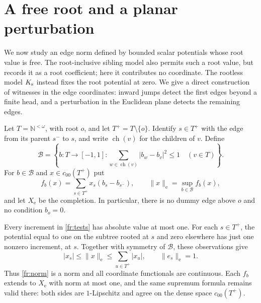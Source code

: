 \section{A free root and a planar perturbation}
\label{fr:section}\label{sec:free-root}

We now study an edge norm defined by bounded scalar potentials whose
root value is free. The root-inclusive sibling model also permits such a
root value, but records it as a root coefficient; here it contributes no
coordinate. The rootless model $K_{\rm s}$ instead fixes the root potential
at zero. We give a direct construction of witnesses in the edge coordinates: inward jumps detect
the first edges beyond a finite head, and a perturbation in the Euclidean
plane detects the remaining edges.

Let $T=\mathbb N^{<\omega}$, with root $o$, and let
$T^+=T\setminus\{o\}$.  Identify $s\in T^+$ with the edge from its
parent $s^-$ to $s$, and write $\operatorname{ch}(v)$ for the children of
$v$.  Define
\begin{equation}
 \mathcal B=\left\{b:T\longrightarrow[-1,1]:
 \sum_{w\in\operatorname{ch}(v)}|b_w-b_v|^2\le1
 \quad(v\in T)\right\}.
 \label{fr:tests}
\end{equation}
For $b\in\mathcal B$ and $x\in c_{00}(T^+)$ put
\begin{equation}
 f_b(x)=\sum_{s\in T^+}x_s(b_s-b_{s^-}),
 \qquad \|x\|_{\mathrm e}=\sup_{b\in\mathcal B}f_b(x),
 \label{fr:norm}
\end{equation}
and let $X_{\mathrm e}$ be the completion.  In particular, there is no
dummy edge above $o$ and no condition $b_o=0$.

Every increment in \eqref{fr:tests} has absolute value at most one.
For each $s\in T^+$, the potential equal to one on the subtree rooted
at $s$ and zero elsewhere has just one nonzero increment, at $s$.
Together with symmetry of $\mathcal B$, these observations give
\[
 |x_s|\le\|x\|_{\mathrm e}\le\sum_{u\in T^+}|x_u|,
 \qquad \|e_s\|_{\mathrm e}=1.
\]
Thus \eqref{fr:norm} is a norm and all coordinate functionals are
continuous.  Each $f_b$ extends to $X_{\mathrm e}$ with norm at most
one, and the same supremum formula remains valid there: both sides are
$1$-Lipschitz and agree on the dense space $c_{00}(T^+)$.

